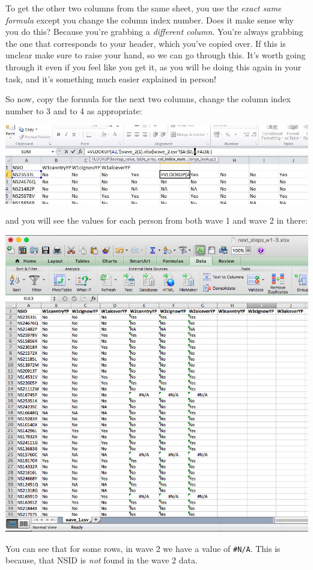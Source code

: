 \documentclass[
]{book}
\begin{document}
To get the other two columns from the same sheet, you use the \emph{exact same formula} except you change the column index number. Does it make sense why you do this? Because you're grabbing a \emph{different column}. You're always grabbing the one that corresponds to your header, which you've copied over. If this is unclear make sure to raise your hand, so we can go through this. It's worth going through it even if you feel like you get it, as you will be doing this again in your task, and it's something much easier explained in person!

So now, copy the formula for the next two columns, change the column index number to 3 and to 4 as appropriate:

\includegraphics{imgs/VLOOKUP.jpg}

and you will see the values for each person from both wave 1 and wave 2 in there:

\includegraphics{imgs/nas_present.png}

You can see that for some rows, in wave 2 we have a value of \texttt{\#N/A}. This is because, that NSID is \emph{not} found in the wave 2 data.
\end{document}
